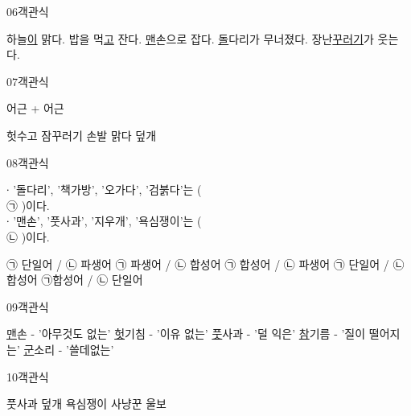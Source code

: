 \documentclass[fs9,seriesRus]{korfarm-base}
\begin{document}
\begin{kfQBlock}{06}{객관식}
\begin{kfChoices}
\kfChoice 하늘\uline{이}  맑다.
\kfChoice 밥을 먹\uline{고} 잔다.
\kfChoice \uline{맨}손으로 잡다.
\kfChoice \uline{돌}다리가 무너졌다.
\kfChoice 장난\uline{꾸러기}가 웃는다.
\end{kfChoices}
\end{kfQBlock}
\begin{kfQBlock}{07}{객관식}
\begin{kfEvidence}어근 + 어근\end{kfEvidence}
\begin{kfChoices}
\kfChoice 헛수고
\kfChoice 잠꾸러기
\kfChoice 손발
\kfChoice 맑다
\kfChoice 덮개
\end{kfChoices}
\end{kfQBlock}
\begin{kfQBlock}{08}{객관식}
\begin{kfEvidence}∙ '돌다리', '책가방', '오가다', '검붉다'는 ( \\\relax
㉠ )이다.   \\\relax
   ∙ '맨손', '풋사과', '지우개', '욕심쟁이'는 ( \\\relax
㉡ )이다.\end{kfEvidence}
\begin{kfChoices}
\kfChoice ㉠ 단일어 / ㉡ 파생어
\kfChoice ㉠ 파생어 / ㉡ 합성어
\kfChoice ㉠ 합성어 / ㉡ 파생어
\kfChoice ㉠ 단일어 / ㉡ 합성어
\kfChoice ㉠합성어 / ㉡ 단일어
\end{kfChoices}
\end{kfQBlock}
\begin{kfQBlock}{09}{객관식}
\begin{kfChoices}
\kfChoice \uline{맨}손 - '아무것도 없는'
\kfChoice \uline{헛}기침 - '이유 없는'
\kfChoice \uline{풋}사과 - '덜 익은'
\kfChoice \uline{참}기름 - '질이 떨어지는'
\kfChoice \uline{군}소리 - '쓸데없는'
\end{kfChoices}
\end{kfQBlock}
\begin{kfQBlock}{10}{객관식}
\begin{kfChoices}
\kfChoice 풋사과
\kfChoice 덮개
\kfChoice 욕심쟁이
\kfChoice 사냥꾼
\kfChoice 울보
\end{kfChoices}
\end{kfQBlock}
\end{document}
